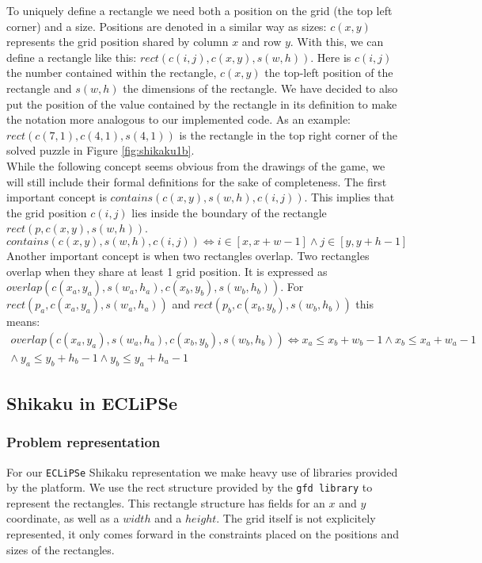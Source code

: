 To uniquely define a rectangle we need both a position on the grid (the top left corner) and a size. Positions are denoted in a similar way as sizes: $c(x,y)$ represents the grid position shared by column $x$ and row $y$. With this, we can define a rectangle like this: $rect(c(i,j),c(x,y),s(w,h))$. Here is $c(i,j)$ the number contained within the rectangle, $c(x,y)$ the top-left position of the rectangle and $s(w,h)$ the dimensions of the rectangle. We have decided to also put the position of the value contained by the rectangle in its definition to make the notation more analogous to our implemented code. As an example: $rect(c(7,1),c(4,1),s(4,1))$ is the rectangle in the top right corner of the solved puzzle in Figure \ref{fig:shikaku1b}. \\

While the following concept seems obvious from the drawings of the game, we will still include their formal definitions for the sake of completeness. The first important concept is $contains(c(x,y), s(w,h),c(i,j))$. This implies that the grid position $c(i,j)$ lies inside the boundary of the rectangle $rect(p,c(x,y),s(w,h))$.
\begin{equation}
contains(c(x,y), s(w,h),c(i,j)) \iff i \in [x,x+w-1] \wedge j \in [y,y+h-1]
\end{equation}
Another important concept is when two rectangles overlap. Two rectangles overlap when they share at least 1 grid position. It is expressed as $overlap(c(x_a,y_a), s(w_a,h_a),c(x_b,y_b), s(w_b,h_b))$. For $rect(p_a, c(x_a,y_a), s(w_a,h_a))$ and $rect(p_b,c(x_b,y_b), s(w_b,h_b))$ this means:
\begin{equation}
\begin{split}
overlap(c(x_a,y_a), s(w_a,h_a),c(x_b,y_b), s(w_b,h_b)) \iff x_a \leq x_b + w_b -1 \wedge x_b \leq x_a + w_a - 1  \\
									   \wedge \: y_a \leq y_b + h_b -1 \wedge y_b \leq y_a + h_a - 1 
\end{split}
\end{equation}

\subsection{Shikaku in ECLiPSe}
\subsubsection{Problem representation}
For our \texttt{ECLiPSe} Shikaku representation we make heavy use of libraries provided by the platform. We use the rect structure provided by the \texttt{gfd library} to represent the rectangles. This rectangle structure has fields for an $x$ and $y$ coordinate, as well as a $width$ and a $height$. The grid itself is not explicitely represented, it only comes forward in the constraints placed on the positions and sizes of the rectangles.

